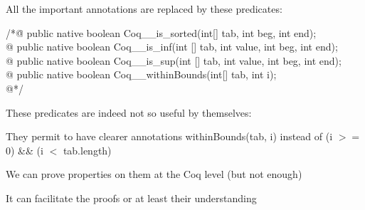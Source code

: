 \small
All the important annotations are replaced by these predicates:
\begin{tabbing}
/*\=@ public native boolean Coq\_\_is\_sorted(int[] tab, int beg, int end);\+ \\
  @ public native boolean Coq\_\_is\_inf(int [] tab, int value, int beg, int end);\\
  @ public native boolean Coq\_\_is\_sup(int [] tab, int value, int beg, int end);\\
  @ public native boolean Coq\_\_withinBounds(int[] tab, int i); \\
  @*/
\end{tabbing}
These predicates are indeed {\purple not so useful} by themselves:
\blist
\item They permit to have {\purple clearer} annotations
withinBounds(tab, i) instead of (i $>=$ 0) \&\& (i $<$ tab.length)
\item We can prove {\purple properties on them} at the Coq level 
(but not enough)
\elist

\rarrow It can facilitate the proofs or at least their understanding


